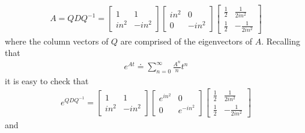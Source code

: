 \documentclass[12pt,reqno]{amsart}
\numberwithin{equation}{section}  %
\numberwithin{figure}{section}
\theoremstyle{plain}
\theoremstyle{definition}
\theoremstyle{remark}
\begin{document}
%
%
%
%
\begin{equation*}
\begin{split}
  A = Q D Q^{-1} = 
  \begin{bmatrix}
  1 & 1
  \\
  in^{2} & -in^{2}
  \end{bmatrix}
  \begin{bmatrix}
    in^{2} & 0 
    \\
    0 & -in^{2}
  \end{bmatrix}
  \begin{bmatrix}
    \frac{1}{2} & \frac{1}{2i n^{2}} \\
    \frac{1}{2} & -\frac{1}{2i n^{2} }
  \end{bmatrix}
\end{split}
\end{equation*}
%
%
where the column vectors of $Q$ are comprised of the eigenvectors of $A$.
Recalling that 
%
%
\begin{equation*}
\begin{split}
  e^{At} \doteq \sum_{n=0}^{\infty} \frac{A^{n}}{n}t^{n}
\end{split}
\end{equation*}
%
%
it is easy to check that 
%
%
\begin{equation*}
\begin{split}
  e^{Q D Q^{-1}} = 
\begin{bmatrix}
  1 & 1
  \\
  in^{2} & -in^{2}
  \end{bmatrix}
  \begin{bmatrix}
    e^{in^{2}} & 0 
    \\
    0 & e^{-in^{2}}
  \end{bmatrix}
  \begin{bmatrix}
    \frac{1}{2} & \frac{1}{2i n^{2}} \\
    \frac{1}{2} & -\frac{1}{2i n^{2} }
  \end{bmatrix}
\end{split}
\end{equation*}
%
%
and 
\end{document}
